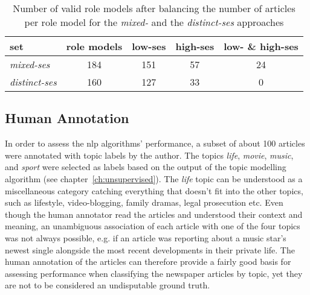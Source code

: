 \begin{table}
    \centering
    \begin{tabular}{lcccc}
        \toprule 
        set & role models & low-\gls{ses} & high-\gls{ses} & low- \& high-\gls{ses} \\ \toprule 
        \textit{mixed-\gls{ses}} & \SI{184}{} & \SI{151}{} & \SI{57}{} & \SI{24}{} \\
        \textit{distinct-\gls{ses}} & \SI{160}{} & \SI{127}{} & \SI{33}{} & \SI{0}{} \\
        \bottomrule
    \end{tabular}
    \caption{Number of valid role models after balancing the number of articles per role model for the \textit{mixed-} and the \textit{distinct-\gls{ses}} approaches}
    \label{tab:role_models_after_balancing}
\end{table}

\subsection*{Human Annotation}
In order to assess the \gls{nlp} algorithms' performance, a subset of about \SI{100}{} articles were annotated with topic labels by the author. The topics \textit{life}, \textit{movie}, \textit{music}, and \textit{sport} were selected as labels based on the output of the topic modelling algorithm (see chapter~\ref{ch:unsupervised}). The \textit{life} topic can be understood as a miscellaneous category catching everything that doesn't fit into the other topics, such as lifestyle, video-blogging, family dramas, legal prosecution etc. Even though the human annotator read the articles and understood their context and meaning, an unambiguous association of each article with one of the four topics was not always possible, e.g. if an article was reporting about a music star's newest single alongside the most recent developments in their private life. The human annotation of the articles can therefore provide a fairly good basis for assessing performance when classifying the newspaper articles by topic, yet they are not to be considered an undisputable ground truth.

